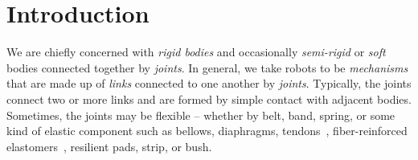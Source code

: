 \chapter{Introduction}  
 \label{chap:back}
 
 We are chiefly concerned with \textit{rigid bodies} and occasionally \textit{semi-rigid} or \textit{soft} bodies connected together by \textit{joints}.   In general, we take robots to be \textit{mechanisms} that are made up of \textit{links} connected to one another by \textit{joints}.  Typically, the joints connect two or more links and are formed by simple contact with adjacent bodies.  Sometimes, the joints may be flexible -- whether by belt, band, spring, or some kind of elastic component such as bellows, diaphragms, tendons~\cite{Bern17ACM}, fiber-reinforced elastomers~\cite{BishopFREE2012}, resilient pads, strip, or bush. 
 
